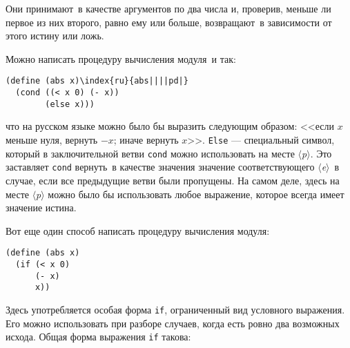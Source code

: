 Они
принимают~в качестве аргументов по два числа и, проверив, меньше
ли первое из них второго, равно ему или больше,
возвращают~в зависимости от этого истину или ложь.

Можно написать процедуру вычисления модуля~и так:

\begin{Verbatim}[fontsize=\small]
(define (abs x)\index{ru}{abs||||pd|}
  (cond ((< x 0) (- x))
        (else x)))
\end{Verbatim}
что на русском языке можно было бы выразить следующим образом: <<если
$x$ меньше нуля, вернуть $-x$; иначе вернуть
$x$>>. 
{\tt Else}
--- специальный символ, который в
заключительной ветви {\tt cond} можно использовать на
месте \textit{$\langle$p$\rangle$}.  Это заставляет
{\tt cond} вернуть~в качестве значения значение
соответствующего \textit{$\langle$e$\rangle$}~в случае, если все
предыдущие ветви были пропущены.  На самом деле, здесь на месте
\textit{$\langle$p$\rangle$} можно было бы использовать любое
выражение, которое всегда имеет значение истина.

Вот еще один способ написать процедуру вычисления
модуля:

\begin{Verbatim}[fontsize=\small]
(define (abs x)
  (if (< x 0)
      (- x)
      x))
\end{Verbatim}
Здесь употребляется особая форма {\tt if},
ограниченный
вид условного выражения.  Его можно использовать при разборе
случаев, когда есть ровно два возможных исхода. Общая форма выражения 
{\tt if} такова:

